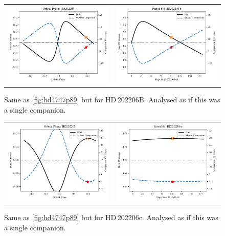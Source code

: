 \begin{figure}
    \centering
    \begin{tabular}{cc}
        \includegraphics[width=0.45\linewidth]{figures/direct-recovery/orbital-plots/HD202206B_orbital_phase.pdf} &
        \includegraphics[width=0.45\linewidth]{figures/direct-recovery/orbital-plots/HD202206B_p89.pdf}\\
    \end{tabular}
    \caption[]{Same as \cref{fig:hd4747p89} but for {HD\,202206}B.
        Analysed as if this was a single companion.}
    \label{fig:hd202206bp89}
\end{figure}

\begin{figure}
    \centering
    \begin{tabular}{cc}
        \includegraphics[width=0.45\linewidth]{figures/direct-recovery/orbital-plots/HD202206c_orbital_phase.pdf} &
        \includegraphics[width=0.45\linewidth]{figures/direct-recovery/orbital-plots/HD202206c_p89.pdf}\\
    \end{tabular}
    \caption[]{Same as \cref{fig:hd4747p89} but for {HD\,202206}c.
        Analysed as if this was a single companion.}
    \label{fig:hd202206cp89}
\end{figure}

